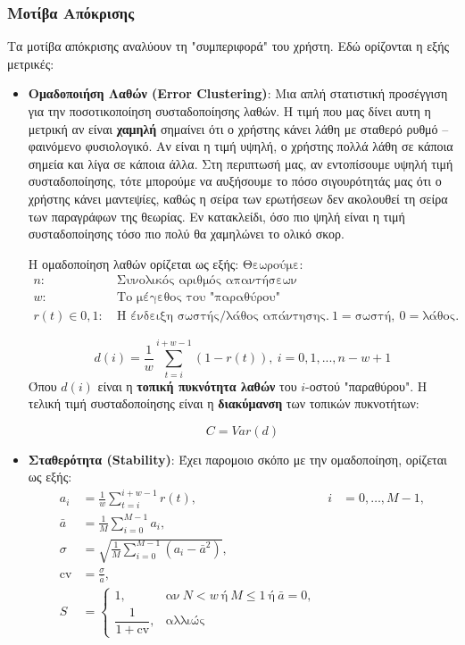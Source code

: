 \subsubsection{Μοτίβα Απόκρισης}
Τα μοτίβα απόκρισης αναλύουν τη "συμπεριφορά" του χρήστη. Εδώ ορίζονται η εξής μετρικές:
\begin{itemize}
    \item \textbf{Ομαδοποιήση Λαθών (\textlatin{Error Clustering})}: Μια απλή στατιστική προσέγγιση για την ποσοτικοποίηση συσταδοποίησης λαθών. Η τιμή που μας δίνει αυτη η μετρική αν είναι \textbf{χαμηλή} σημαίνει ότι ο χρήστης κάνει λάθη με σταθερό ρυθμό -- φαινόμενο φυσιολογικό. Αν είναι η τιμή υψηλή, ο χρήστης πολλά λάθη σε κάποια σημεία και λίγα σε κάποια άλλα. Στη περιπτωσή μας, αν εντοπίσουμε υψηλή τιμή συσταδοποίησης, τότε μπορούμε να αυξήσουμε το πόσο σιγουρότητάς μας ότι ο χρήστης κάνει μαντεψίες, καθώς η σείρα των ερωτήσεων δεν ακολουθεί τη σείρα των παραγράφων της θεωρίας. Εν κατακλείδι, όσο πιο ψηλή είναι η τιμή συσταδοποίησης τόσο πιο πολύ θα χαμηλώνει το ολικό σκορ. 
    
    Η ομαδοποίηση λαθών ορίζεται ως εξής:
    $\text{Θεωρούμε:}$
    \begin{align*}
        n:\ &\text{Συνολικός αριθμός απαντήσεων} \\
        w:\ &\text{Το μέγεθος του "παραθύρου"} \\
        r(t) \in {0, 1}:\ &\text{Η ένδειξη σωστής/λάθος απάντησης.}\ 1 = \text{σωστή},\ 0 = \text{λάθος}. 
    \end{align*}

    $$
        d(i) = \frac{1}{w} \sum_{t=i}^{i+w-1}{(1 - r(t))},\ i = 0,1,...,n - w + 1
    $$
    Όπου $d(i)$ είναι η \textbf{τοπική πυκνότητα λαθών} του $i$-οστού "παραθύρου".
    Η τελική τιμή συσταδοποίησης είναι η \textbf{διακύμανση} των τοπικών πυκνοτήτων:

    $$
        C = Var(d)
    $$
    
    \item \textbf{Σταθερότητα (\textlatin{Stability})}: Έχει παρομοιο σκόπο με την ομαδοποίηση, ορίζεται ως εξής:
    \begin{align*}
        a_i &= \frac{1}{w}\sum_{t=i}^{i+w-1} r(t), & i &= 0,\dots,M-1, \\
        \bar a &= \frac{1}{M}\sum_{i=0}^{M-1} a_i, \\
        \sigma &= \sqrt{\frac{1}{M}\sum_{i=0}^{M-1} (a_i - \bar a^2)}, \\
        \mathrm{cv} &= \frac{\sigma}{\bar a}, \\
        S &= 
        \begin{cases}
            1, 
            & \text{αν}\ N < w\ \text{ή}\ M \le 1\ \text{ή}\ \bar a = 0, \\
            \dfrac{1}{1 + \mathrm{cv}}, 
            & \text{αλλιώς}
        \end{cases} 
    \end{align*} 


\end{itemize}
